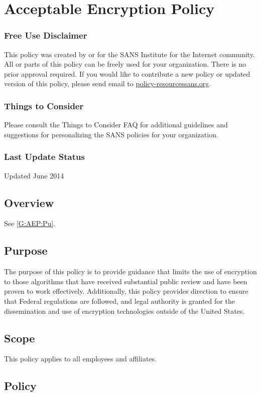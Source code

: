 \chapter{Acceptable Encryption Policy}
\setcounter{section}{0}
\subsection*{Free Use Disclaimer}
This policy was created by or for the SANS Institute for the Internet community.
All or parts of this policy can be freely used for your organization.
There is no prior approval required.
If you would like to contribute a new policy or updated version of this policy, please send email to \href{mailto:policy-resources@sans.org}{policy-resources\at{}sans.org}.
\subsection*{Things to Consider}
Please consult the Things to Consider FAQ for additional guidelines and suggestions for personalizing the SANS policies for your organization.
\subsection*{Last Update Status}
Updated June 2014

\section{Overview}
See \vref{G:AEP:Pu}.

\section{Purpose}\label{G:AEP:Pu}
The purpose of this policy is to provide guidance that limits the use of encryption to those algorithms that have received substantial public review and have been proven to work effectively.
Additionally, this policy provides direction to ensure that Federal regulations are followed, and legal authority is granted for the dissemination and use of encryption technologies outside of the United States.

\section{Scope}
This policy applies to all \CompanyName{} employees and affiliates.

\section{Policy}
